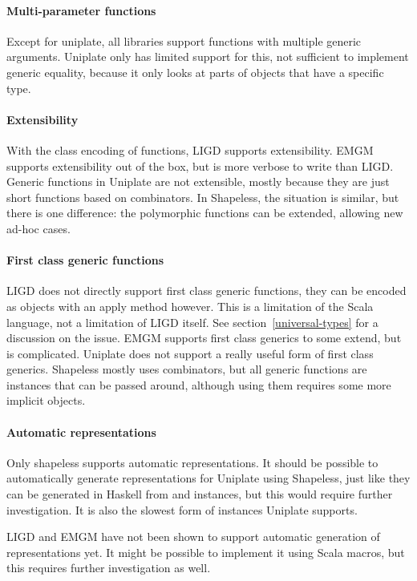\paragraph{Multi-parameter functions}
Except for uniplate, all libraries support functions with multiple generic
arguments. Uniplate only has limited support for this, not sufficient to
implement generic equality, because it only looks at parts of objects that
have a specific type.

\paragraph{Extensibility}
With the class encoding of functions, LIGD supports
extensibility. EMGM supports extensibility out of the box, but is more verbose
to write than LIGD. Generic functions in Uniplate are not extensible, mostly
because they are just short functions based on combinators. In Shapeless, the
situation is similar, but there is one difference: the polymorphic functions
can be extended, allowing new ad-hoc cases.

\paragraph{First class generic functions}
LIGD does not directly support first class generic functions, they can be encoded as
objects with an apply method however. This is a limitation of the Scala
language, not a limitation of LIGD itself. See section~\ref{universal-types}
for a discussion on the issue. EMGM supports first class generics to some
extend, but is complicated. Uniplate does not support a really useful form
of first class generics. Shapeless mostly uses combinators, but
all generic functions are  instances that can be passed around,
although using them requires some more implicit objects.

\paragraph{Automatic representations}
Only shapeless supports automatic representations. It should be possible to
automatically generate representations for Uniplate using Shapeless,
just like they can be generated in Haskell from  and 
instances, but this would require further investigation. It is also the slowest
form of instances Uniplate supports.

LIGD and EMGM have not been shown to support automatic generation of
representations yet. It might be possible to implement it using Scala
macros, but this requires further investigation as well.


